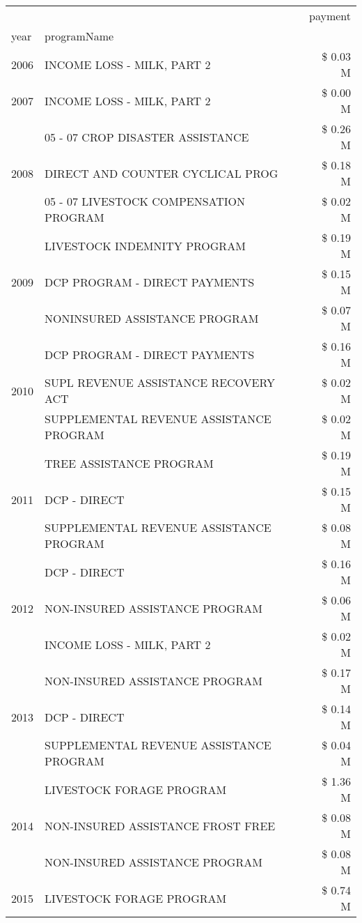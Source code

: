 \begin{tabular}{llr}
\toprule
 &  & payment \\
year & programName &  \\
\midrule
2006 & INCOME LOSS - MILK, PART 2 & \$ 0.03 M \\
\cline{1-3}
2007 & INCOME LOSS - MILK, PART 2 & \$ 0.00 M \\
\cline{1-3}
\multirow[t]{3}{*}{2008} & 05 - 07 CROP DISASTER ASSISTANCE & \$ 0.26 M \\
 & DIRECT AND COUNTER CYCLICAL PROG & \$ 0.18 M \\
 & 05 - 07 LIVESTOCK COMPENSATION PROGRAM & \$ 0.02 M \\
\cline{1-3}
\multirow[t]{3}{*}{2009} & LIVESTOCK INDEMNITY PROGRAM & \$ 0.19 M \\
 & DCP PROGRAM - DIRECT PAYMENTS & \$ 0.15 M \\
 & NONINSURED ASSISTANCE PROGRAM & \$ 0.07 M \\
\cline{1-3}
\multirow[t]{3}{*}{2010} & DCP PROGRAM - DIRECT PAYMENTS & \$ 0.16 M \\
 & SUPL REVENUE ASSISTANCE RECOVERY ACT & \$ 0.02 M \\
 & SUPPLEMENTAL REVENUE ASSISTANCE PROGRAM & \$ 0.02 M \\
\cline{1-3}
\multirow[t]{3}{*}{2011} & TREE ASSISTANCE PROGRAM & \$ 0.19 M \\
 & DCP - DIRECT & \$ 0.15 M \\
 & SUPPLEMENTAL REVENUE ASSISTANCE PROGRAM & \$ 0.08 M \\
\cline{1-3}
\multirow[t]{3}{*}{2012} & DCP - DIRECT & \$ 0.16 M \\
 & NON-INSURED ASSISTANCE PROGRAM & \$ 0.06 M \\
 & INCOME LOSS - MILK, PART 2 & \$ 0.02 M \\
\cline{1-3}
\multirow[t]{3}{*}{2013} & NON-INSURED ASSISTANCE PROGRAM & \$ 0.17 M \\
 & DCP - DIRECT & \$ 0.14 M \\
 & SUPPLEMENTAL REVENUE ASSISTANCE PROGRAM & \$ 0.04 M \\
\cline{1-3}
\multirow[t]{3}{*}{2014} & LIVESTOCK FORAGE PROGRAM & \$ 1.36 M \\
 & NON-INSURED ASSISTANCE FROST FREE & \$ 0.08 M \\
 & NON-INSURED ASSISTANCE PROGRAM & \$ 0.08 M \\
\cline{1-3}
\multirow[t]{3}{*}{2015} & LIVESTOCK FORAGE PROGRAM & \$ 0.74 M \\

\end{tabular}
